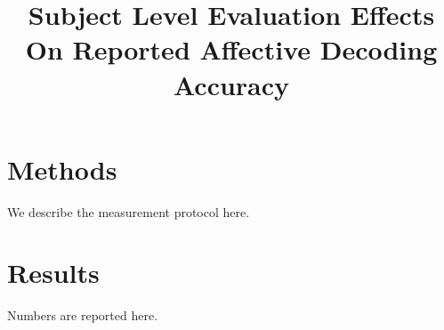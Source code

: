 \documentclass{article}
\title{Subject Level Evaluation Effects On Reported Affective Decoding Accuracy}
\begin{document}
\section{Methods}
We describe the measurement protocol here.
\section{Results}
Numbers are reported here.
\end{document}
